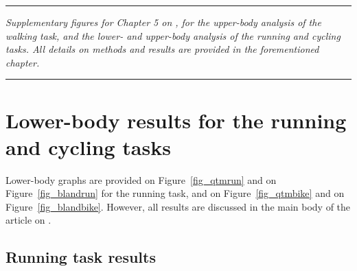 
\begin{center}
\rule{0.7\linewidth}{.5pt}
\begin{minipage}{0.7\linewidth}
\smallskip

\textit{
Supplementary figures for Chapter 5 on , for the upper-body analysis of the walking task, and the lower- and upper-body analysis of the running and cycling tasks. \newline\newline All details on methods and results are provided in the forementioned chapter.
}

\end{minipage}
\smallskip
\rule{0.7\linewidth}{.5pt}
\end{center}

\minitoc
\newpage

\section{Lower-body results for the running and cycling tasks}

Lower-body graphs are provided on Figure~\ref{fig_qtmrun} and on Figure~\ref{fig_blandrun} for the running task, and on Figure~\ref{fig_qtmbike} and on Figure~\ref{fig_blandbike}. However, all results are discussed in the main body of the article on .

\subsection{Running task results}

